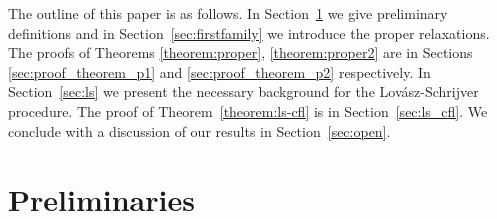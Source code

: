 \documentclass[11pt]{article}\usepackage{amsmath}
\newcommand{\lbfl}{{\sc Lbfl}}
\newcommand{\cfl}{{\sc Cfl}}
\begin{document}
\bigskip

The outline of this paper is as follows. In Section~\ref{sec:prel} we give
preliminary definitions and in Section~\ref{sec:firstfamily} we introduce the proper
relaxations. The proofs of Theorems \ref{theorem:proper}, \ref{theorem:proper2} are  in Sections
\ref{sec:proof_theorem_p1} and \ref{sec:proof_theorem_p2} respectively. In Section~\ref{sec:ls} we present the
necessary background for the Lov\'{a}sz-Schrijver procedure. The proof of
Theorem~\ref{theorem:ls-cfl} is in Section~\ref{sec:ls_cfl}. We conclude with a 
discussion of our results in Section~\ref{sec:open}. 






\iffalse 


\section{Preliminaries}
\label{sec:prel}

\iffalse -------- removed, they are already in the intro --------
In an  instance $I(F,C)$ of the  general lower bounded-capacitated facility  location problem
(\lbfl\/, \cfl\/)   we  are  given a  set of  facilities
$F$ and a set of clients $C$ in some metric space.
Each  facility $i \in  F$ has  an opening  cost $f_i$  and a capacity $C_i$ (\cfl\/) or a
bound $B_i$ (\lbfl\/). We seek to open some facilities of $F$
and assign the demand  of each client $j$
to some opened facilities (we allow splittable demands).  
The cost for serving a unit of demand of client $j$ by an open facility $i$ is
$c_{ij}$, 
where  $c_{ij}$  is  the distance  between  $i$  and
$j$. As mentioned, distances $c_{ij}$ satisfy the triangle inequality. Moreover each
open facility $i$ must serve at most
$C_i$ in a \cfl\ instance or at least $B_i$ total demand in a \lbfl\/.Our
objective  is to  minimize the  total facility  opening cost  plus the
total service cost. We use $n, m$ to denote $|F|$ and $|C|$
respectively.
-------------- \fi
\end{document}
